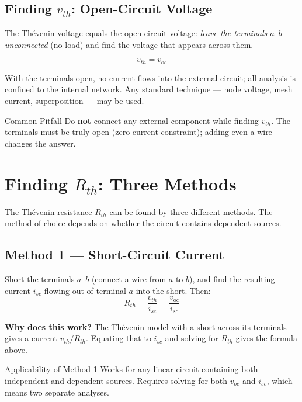\documentclass[twoside]{article}
\begin{document}
\subsection{Finding \texorpdfstring{$v_{th}$}{vth}: Open-Circuit Voltage}

The Th\'{e}venin voltage equals the open-circuit voltage: \emph{leave the terminals $a$--$b$ unconnected} (no load) and find the voltage that appears across them.

\[
    \boxed{v_{th} = v_{\text{oc}}}
\]

With the terminals open, no current flows into the external circuit; all analysis is confined to the internal network.  Any standard technique — node voltage, mesh current, superposition — may be used.

\begin{redbox}{Common Pitfall}
Do \textbf{not} connect any external component while finding $v_{th}$.  The terminals must be truly open (zero current constraint); adding even a wire changes the answer.
\end{redbox}

\section{Finding \texorpdfstring{$R_{th}$}{Rth}: Three Methods}
\label{sec:rth}

The Th\'{e}venin resistance $R_{th}$ can be found by three different methods.  The method of choice depends on whether the circuit contains dependent sources.

\subsection{Method 1 — Short-Circuit Current}

Short the terminals $a$--$b$ (connect a wire from $a$ to $b$), and find the resulting current $i_{sc}$ flowing out of terminal $a$ into the short.  Then:
\[
    \boxed{R_{th} = \frac{v_{th}}{i_{sc}} = \frac{v_{\text{oc}}}{i_{sc}}}
\]

\textbf{Why does this work?}  The Th\'{e}venin model with a short across its terminals gives a current $v_{th}/R_{th}$.  Equating that to $i_{sc}$ and solving for $R_{th}$ gives the formula above.

\begin{cyanbox}{Applicability of Method 1}
Works for any linear circuit containing both independent and dependent sources.  Requires solving for both $v_{oc}$ and $i_{sc}$, which means two separate analyses.
\end{cyanbox}
\end{document}
